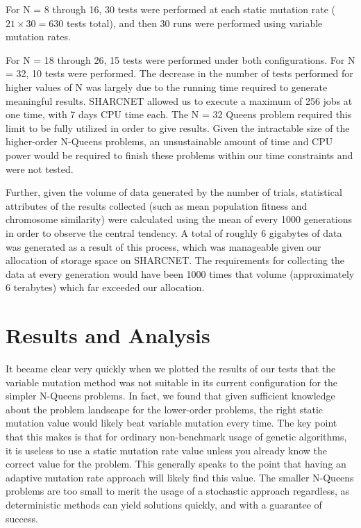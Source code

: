 \documentclass{sig-alternate}
\begin{document}
For N = 8 through 16, 30 tests were performed at each static mutation rate ($21 \times 30 = 630$ tests total), and then 30 runs were performed using variable mutation rates. 

For N = 18 through 26, 15 tests were performed under both configurations. For N = 32, 10 tests were performed. The decrease in the number of tests performed for higher values of N was largely due to the running time required to generate meaningful results. SHARCNET allowed us to execute a maximum of 256 jobs at one time, with 7 days CPU time each. The N = 32 Queens problem required this limit to be fully utilized in order to give results. Given the intractable size of the higher-order N-Queens problems, an unsustainable amount of time and CPU power would be required to finish these problems within our time constraints and were not tested.

Further, given the volume of data generated by the number of trials, statistical attributes of the results collected (such as mean population fitness and chromosome similarity) were calculated using the mean of every 1000 generations in order to observe the central tendency. A total of roughly 6 gigabytes of data was generated as a result of this process, which was manageable given our allocation of storage space on SHARCNET. The requirements for collecting the data at every generation would have been 1000 times that volume (approximately 6 terabytes) which far exceeded our allocation.

% 
%
\newpage
\section{Results and Analysis}
It became clear very quickly when we plotted the results of our tests that the variable mutation method was not suitable in its current configuration for the simpler N-Queens problems. In fact, we found that given sufficient knowledge about the problem landscape for the lower-order problems, the right static mutation value would likely beat variable mutation every time. The key point that this makes is that for ordinary non-benchmark usage of genetic algorithms, it is useless to use a static mutation rate value unless you already know the correct value for the problem. This generally speaks to the point that having an adaptive mutation rate approach will likely find this value. The smaller N-Queens problems are too small to merit the usage of a stochastic approach regardless, as deterministic methods can yield solutions quickly, and with a guarantee of success.
\end{document}
